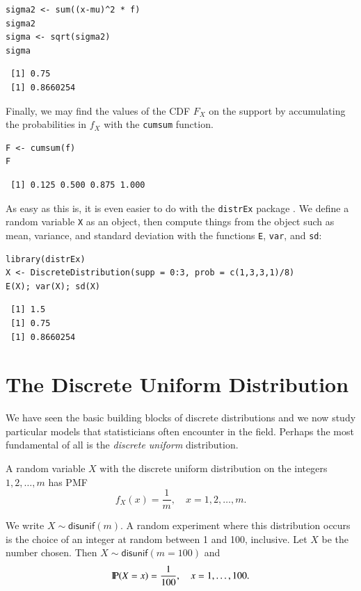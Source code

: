 \documentclass[captions=tableheading]{scrbook}
\begin{document}
\begin{verbatim}
sigma2 <- sum((x-mu)^2 * f)
sigma2
sigma <- sqrt(sigma2)
sigma
\end{verbatim}

\begin{verbatim}
 [1] 0.75
 [1] 0.8660254
\end{verbatim}

Finally, we may find the values of the CDF \(F_{X}\) on the support by accumulating the probabilities in \(f_{X}\) with the \texttt{cumsum} function. 


\begin{verbatim}
F <- cumsum(f)
F
\end{verbatim}

\begin{verbatim}
 [1] 0.125 0.500 0.875 1.000
\end{verbatim}

As easy as this is, it is even easier to do with the \texttt{distrEx} package \cite{Ruckdescheldistr}. We define a random variable \texttt{X} as an object, then compute things from the object such as mean, variance, and standard deviation with the functions \texttt{E}, \texttt{var}, and \texttt{sd}:


\begin{verbatim}
library(distrEx)
X <- DiscreteDistribution(supp = 0:3, prob = c(1,3,3,1)/8)
E(X); var(X); sd(X)
\end{verbatim}

\begin{verbatim}
 [1] 1.5
 [1] 0.75
 [1] 0.8660254
\end{verbatim}
\section{The Discrete Uniform Distribution}
\label{sec-1-2}

\label{sec:disc-uniform-dist}

We have seen the basic building blocks of discrete distributions and we now study particular models that statisticians often encounter in the field. Perhaps the most fundamental of all is the \emph{discrete uniform} distribution.

A random variable \(X\) with the discrete uniform distribution on the integers \(1,2,\ldots,m\) has PMF
\begin{equation}
f_{X}(x)=\frac{1}{m},\quad x=1,2,\ldots,m.
\end{equation}

We write \(X\sim\mathsf{disunif}(m)\). A random experiment where this distribution occurs is the choice of an integer at random between 1 and 100, inclusive. Let \(X\) be the number chosen. Then \(X\sim\mathsf{disunif}(m=100)\) and
\[
\P(X=x)=\frac{1}{100},\quad x=1,\ldots,100.
\]
\end{document}
